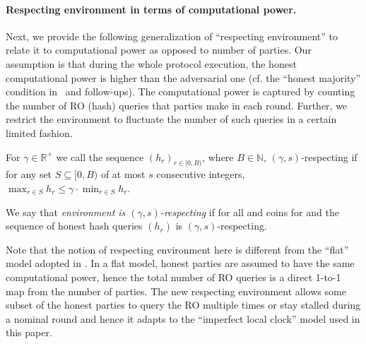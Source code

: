 \paragraph{Respecting environment in terms of computational power.}
%
Next, we provide the following generalization of ``respecting environment'' to relate it to computational power as opposed to number of parties.
%
Our assumption is that during the whole protocol execution, the honest computational power is higher than the adversarial one (cf. the ``honest majority'' condition in~\cite{EC:GarKiaLeo15} and follow-ups).
%
The computational power is captured by counting the number of RO (hash) queries that parties make in each round.
%
Further, we restrict the environment to fluctuate the number of such queries in a certain limited fashion.

\begin{definition} \label{def:respecting-env}
    For $\gamma \in \mathbb{R}^+$ we call the sequence $(h_r)_{r \in [0, B)}$, where $B \in \mathbb{N}$, $(\gamma, s)$-respecting if for any set $S \subseteq [0, B)$ of at most $s$ consecutive integers, $\max_{r \in S} h_r \le \gamma \cdot \min_{r \in S} h_r$.
\end{definition}

We say that \emph{environment \Z is $(\gamma, s)$-respecting} if for all \adv and coins for \Z and \adv the sequence of honest hash queries $(h_r)$ is $(\gamma, s)$-respecting.

Note that the notion of respecting environment here is different from the ``flat'' model adopted in \cite{EC:GarKiaLeo15,C:GarKiaLeo17,EPRINT:GarKiaLeo20,C:BMTZ17}.
%
In a flat model, honest parties are assumed to have the same computational power, hence the total number of RO queries is a direct 1-to-1 map from the number of parties.
%
The new respecting environment allows some subset of the honest parties to query the RO multiple times or stay stalled during a nominal round and hence it adapts to the ``imperfect local clock'' model used in this paper.
